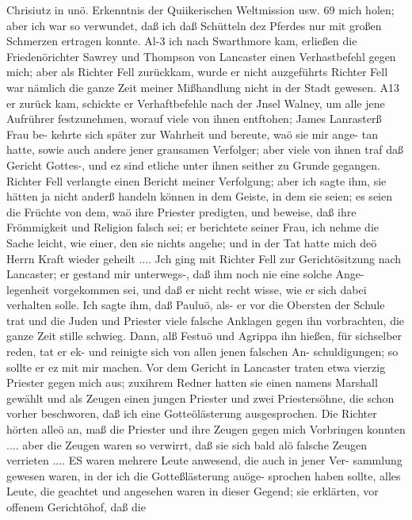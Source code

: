 Chrisiutz in unö. Erkenntnis der Quiikerischen Weltmission usw. 69
mich holen; aber ich war so verwundet, daß ich daß Schütteln
dez Pferdes nur mit großen Schmerzen ertragen konnte. Al-3 ich
nach Swarthmore kam, erließen die Friedenörichter Sawrey und
Thompson von Lancaster einen Verhastbefehl gegen mich; aber
als Richter Fell zurückkam, wurde er nicht auzgeführts Richter
Fell war nämlich die ganze Zeit meiner Mißhandlung nicht in
der Stadt gewesen. A13 er zurück kam, schickte er Verhaftbefehle
nach der Jnsel Walney, um alle jene Aufrührer festzunehmen,
worauf viele von ihnen entftohen; James Lanrasterß Frau be-
kehrte sich später zur Wahrheit und bereute, waö sie mir ange-
tan hatte, sowie auch andere jener grausamen Verfolger; aber
viele von ihnen traf daß Gericht Gottes-, und ez sind etliche unter
ihnen seither zu Grunde gegangen. Richter Fell verlangte einen
Bericht meiner Verfolgung; aber ich sagte ihm, sie hätten ja nicht
anderß handeln können in dem Geiste, in dem sie seien; es seien
die Früchte von dem, waö ihre Priester predigten, und beweise,
daß ihre Frömmigkeit und Religion falsch sei; er berichtete seiner
Frau, ich nehme die Sache leicht, wie einer, den sie nichts angehe;
und in der Tat hatte mich deö Herrn Kraft wieder geheilt ....
Jch ging mit Richter Fell zur Gerichtösitzung nach Lancaster;
er gestand mir unterwegs-, daß ihm noch nie eine solche Ange-
legenheit vorgekommen sei, und daß er nicht recht wisse, wie
er sich dabei verhalten solle. Ich sagte ihm, daß Pauluö, als-
er vor die Obersten der Schule trat und die Juden und Priester
viele falsche Anklagen gegen ihn vorbrachten, die ganze Zeit stille
schwieg. Dann, alß Festuö und Agrippa ihn hießen, für sichselber
reden, tat er ek- und reinigte sich von allen jenen falschen An-
schuldigungen; so sollte er ez mit mir machen. Vor dem Gericht
in Lancaster traten etwa vierzig Priester gegen mich aus; zuxihrem
Redner hatten sie einen namens Marshall gewählt und als
Zeugen einen jungen Priester und zwei Priestersöhne, die schon
vorher beschworen, daß ich eine Gotteölästerung ausgesprochen.
Die Richter hörten alleö an, maß die Priester und ihre Zeugen
gegen mich Vorbringen konnten .... aber die Zeugen waren
so verwirrt, daß sie sich bald alö falsche Zeugen verrieten ....
ES waren mehrere Leute anwesend, die auch in jener Ver-
sammlung gewesen waren, in der ich die Gotteßlästerung auöge-
sprochen haben sollte, alles Leute, die geachtet und angesehen waren
in dieser Gegend; sie erklärten, vor offenem Gerichtöhof, daß die

